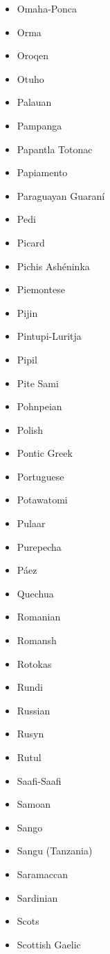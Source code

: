 \documentclass[paper=a4, 12pt]{scrbook}
\begin{document}
\begin{multicols}{3}
\begin{itemize}
        \item Omaha-Ponca
        \item Orma
        \item Oroqen
        \item Otuho
        \item Palauan
        \item Pampanga
        \item Papantla Totonac
        \item Papiamento
        \item Paraguayan Guaraní
        \item Pedi
        \item Picard
        \item Pichis Ashéninka
        \item Piemontese
        \item Pijin
        \item Pintupi-Luritja
        \item Pipil
        \item Pite Sami
        \item Pohnpeian
        \item Polish
        \item Pontic Greek
        \item Portuguese
        \item Potawatomi
        \item Pulaar
        \item Purepecha
        \item Páez
        \item Quechua
        \item Romanian
        \item Romansh
        \item Rotokas
        \item Rundi
        \item Russian
        \item Rusyn
        \item Rutul
        \item Saafi-Saafi
        \item Samoan
        \item Sango
        \item Sangu (Tanzania)
        \item Saramaccan
        \item Sardinian
        \item Scots
        \item Scottish Gaelic

\end{itemize}
\end{multicols}
\end{document}
